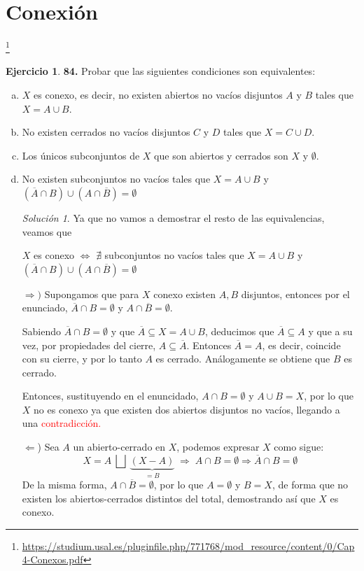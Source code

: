 \documentclass[12pt,twoside]{report}
\theoremstyle{azul}
\theoremstyle{azul2}
\theoremstyle{plain}
\theoremstyle{definition}
\newtheorem*{ejern}{Ejercicio}
\theoremstyle{remark}
\newtheorem*{sol}{Solución}
\begin{document}
\newpage\section{Conexión} \vspace{-15mm} \hfill \footnote{\url{https://studium.usal.es/pluginfile.php/771768/mod_resource/content/0/Cap4-Conexos.pdf}}
\begin{ejern} \textbf{84.} Probar que las siguientes condiciones son equivalentes:
\begin{enumerate}[a)]
    \item $X$ es conexo, es decir, no existen abiertos no vacíos disjuntos $A$ y $B$ tales que $X = A \cup B$. 
    \item No existen cerrados no vacíos disjuntos $C$ y $D$ tales que $X = C \cup D.$
    \item Los {\'u}nicos subconjuntos de $X$ que son abiertos y cerrados son $X$ y $\emptyset$.
    \item No existen subconjuntos no vacíos tales que $X=A \cup B$ y $(\overline{A} \cap B) \cup (A \cap \overline{B}) = \emptyset$
    \begin{sol} Ya que no vamos a demostrar el resto de las equivalencias, veamos que 
    \begin{center}
        $X$ es conexo $\Leftrightarrow$ $\nexists$ subconjuntos no vacíos tales que $X=A \cup B$ y $(\overline{A} \cap B) \cup (A \cap \overline{B}) = \emptyset$
    \end{center}
    $\Rightarrow)$ Supongamos que para $X$ conexo existen $A, B$ disjuntos, entonces por el enunciado, $\overline{A} \cap B = \emptyset$ y $A \cap \overline{B} = \emptyset$. 
    
    Sabiendo $\overline{A} \cap B =\emptyset$ y que $\overline{A} \subseteq X = A \cup B$, deducimos que $\overline{A} \subseteq A$ y que a su vez, por propiedades del cierre, $A \subseteq \overline{A}$. Entonces $\overline{A}=A$, es decir, coincide con su cierre, y por lo tanto $A$ es cerrado. Análogamente se obtiene que $B$ es cerrado. 
    
    Entonces, sustituyendo en el enuncidado, $A \cap B = \emptyset$ y $A \cup B = X$, por lo que $X$ no es conexo ya que existen dos abiertos disjuntos no vacíos, llegando a una \textcolor{red}{contradicción.} 
    
    $\Leftarrow$) Sea $A$ un abierto-cerrado en $X$, podemos expresar $X$ como sigue:
    $$X = A \: \bigsqcup \: \underbrace{(X - A)}_{=B} \; \Rightarrow \; A \cap B = \emptyset \Rightarrow \overline{A} \cap B = \emptyset $$
    De la misma forma, $A \cap \overline{B} = \emptyset$, por lo que $A=\emptyset$ y $B=X$, de forma que no existen los abiertos-cerrados distintos del total, demostrando así que $X$ es conexo. 
    \end{sol}
\end{enumerate}

\end{ejern}
\end{document}
